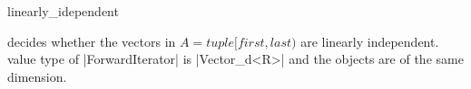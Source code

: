 \ccHtmlNoRefLinks
\begin{ccRefFunction}{linearly_idependent}
\ccHtmlNoLinks

{decides whether the vectors in $A = tuple [first,last)$ are linearly
 independent.  \ccPrecond value type of |ForwardIterator| is
 |Vector_d<R>| and the objects are of the same dimension.}

\end{ccRefFunction}

